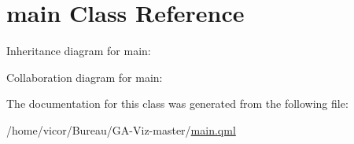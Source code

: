 \hypertarget{classmain}{}\section{main Class Reference}
\label{classmain}


Inheritance diagram for main\+:


Collaboration diagram for main\+:


The documentation for this class was generated from the following file\+:\begin{DoxyCompactItemize}
\item 
/home/vicor/\+Bureau/\+G\+A-\/\+Viz-\/master/\hyperlink{main_8qml}{main.\+qml}\end{DoxyCompactItemize}
